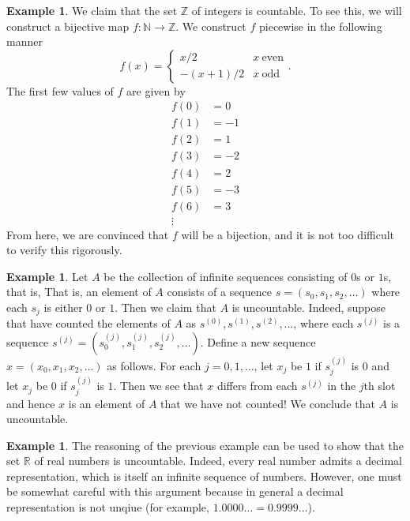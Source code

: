 \documentclass[12pt]{article}
\theoremstyle{definition}
\newtheorem{example}[definition]{Example}
\theoremstyle{theorem}
\begin{document}
\begin{example}
We claim that the set $\mathbb{Z}$ of integers is countable. To see this, we will construct a bijective map $f : \mathbb{N} \to \mathbb{Z}$. We construct $f$ piecewise in the following manner 
\[
f(x) = \begin{cases}
x/2 & x \: \text{even} \\
-(x+1)/2 & x \: \text{odd}
\end{cases}.
\]
The first few values of $f$ are given by 
\begin{align*}
f(0) &= 0 \\
f(1) &= -1 \\
f(2) &= 1 \\
f(3) &= -2 \\
f(4) &= 2 \\
f(5) &= -3 \\
f(6) &= 3 \\
\vdots 
\end{align*} 
From here, we are convinced that $f$ will be a bijection, and it is not too difficult to verify this rigorously. 
\end{example}

\begin{example}
Let $A$ be the collection of infinite sequences consisting of $0$s or $1$s, that is, That is, an element of $A$ consists of a sequence $s = (s_0, s_1, s_2, \ldots)$ where each $s_j$ is either $0$ or $1$. Then we claim that $A$ is uncountable. Indeed, suppose that have counted the elements of $A$ as $s^{(0)}, s^{(1)}, s^{(2)}, \ldots$, where each $s^{(j)}$ is a sequence $s^{(j)} = (s^{(j)}_0, s^{(j)}_1, s^{(j)}_2, \ldots)$. Define a new sequence $x = (x_0, x_1, x_2, \ldots)$ as follows. For each $j =0, 1, \ldots$, let $x_j$ be $1$ if $s_j^{(j)}$ is $0$ and let $x_j$ be $0$ if $s_j^{(j)}$ is $1$. Then we see that $x$ differs from each $s^{(j)}$ in the $j$th slot and hence $x$ is an element of $A$ that we have not counted! We conclude that $A$ is uncountable. 
\end{example} 

\begin{example}
The reasoning of the previous example can be used to show that the set $\mathbb{R}$ of real numbers is uncountable. Indeed, every real number admits a decimal representation, which is itself an infinite sequence of numbers. However, one must be somewhat careful with this argument because in general a decimal representation is not unqiue (for example, $1.0000\ldots = 0.9999\ldots$). 
\end{example}
\end{document}
